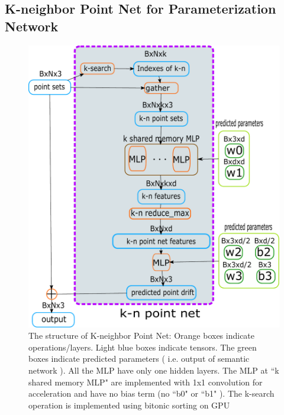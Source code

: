 \subsection{K-neighbor Point Net for Parameterization Network} 
\label{subsec:k-n_point_net}
\begin{figure}[htbp]
	\centering
	\includegraphics[width=\linewidth]{img/net/k-n_pointnet}
	\caption{The structure of K-neighbor Point Net: Orange boxes indicate operations/layers. Light blue boxes indicate tensors. The green boxes indicate predicted parameters ( i.e. output of semantic network ). All the MLP have only one hidden layers. The MLP at ``k shared memory MLP" are implemented with 1x1 convolution for acceleration and have no bias term (no ``b0" or ``b1" ). The k-search operation is implemented using bitonic sorting\cite{bitonicsorter} on GPU}
	\label{fig:knpointnet}
\end{figure}
